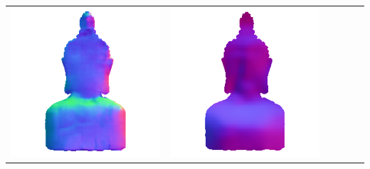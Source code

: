 \begin{tabularx}{\linewidth}{@{}Y@{}Y@{}Y@{}Y@{}Y@{}Y@{}}
\includegraphics[width=\linewidth]{semisynthetic/20150514_16_marrnet_out.png} &
\includegraphics[width=\linewidth]{semisynthetic/20150514_16_ef_out.png} \\

\end{tabularx}
